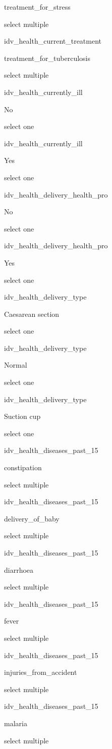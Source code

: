 \documentclass[]{article}
\begin{document}
treatment\_for\_stress

select multiple

idv\_health\_current\_treatment

treatment\_for\_tuberculosis

select multiple

idv\_health\_currently\_ill

No

select one

idv\_health\_currently\_ill

Yes

select one

idv\_health\_delivery\_health\_pro

No

select one

idv\_health\_delivery\_health\_pro

Yes

select one

idv\_health\_delivery\_type

Caesarean section

select one

idv\_health\_delivery\_type

Normal

select one

idv\_health\_delivery\_type

Suction cup

select one

idv\_health\_diseases\_past\_15

constipation

select multiple

idv\_health\_diseases\_past\_15

delivery\_of\_baby

select multiple

idv\_health\_diseases\_past\_15

diarrhoea

select multiple

idv\_health\_diseases\_past\_15

fever

select multiple

idv\_health\_diseases\_past\_15

injuries\_from\_accident

select multiple

idv\_health\_diseases\_past\_15

malaria

select multiple
\end{document}
